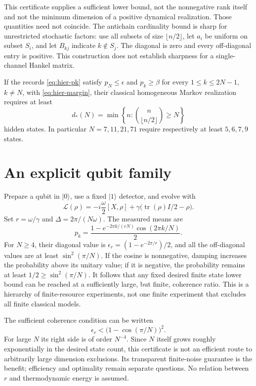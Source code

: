 This certificate supplies a sufficient lower bound, not the nonnegative rank
itself and not the minimum dimension of a positive dynamical realization.
Those quantities need not coincide. The antichain cardinality bound is sharp
for unrestricted stochastic factors: use all subsets of size $\lfloor n/2\rfloor$,
let $a_i$ be uniform on subset $S_i$, and let $B_{kj}$ indicate $k\notin S_j$.
The diagonal is zero and every off-diagonal entry is positive. This construction
does not establish sharpness for a single-channel Hankel matrix.

\begin{corollary}
\label{cor:hierarchy}
If the records \eqref{eq:hier-pk} satisfy $p_N\le\epsilon$ and
$p_k\ge\beta$ for every $1\le k\le2N-1$, $k\ne N$, with
\eqref{eq:hier-margin}, their classical homogeneous Markov realization requires
at least
\[
 d_*(N)=\min\left\{n:{n\choose\lfloor n/2\rfloor}\ge N\right\}
\]
hidden states. In particular $N=7,11,21,71$ require respectively at least
$5,6,7,9$ states.
\end{corollary}

\section{An explicit qubit family}
Prepare a qubit in $|0\rangle$, use a fixed $|1\rangle$ detector, and evolve
with
\[
 \mathcal L(\rho)=-i\frac{\omega}{2}[X,\rho]
 +\gamma\bigl(\operatorname{tr}(\rho)I/2-\rho\bigr).
\]
Set $r=\omega/\gamma$ and $\Delta=2\pi/(N\omega)$. The measured means are
\begin{equation}
 p_k=\frac{1-e^{-2\pi k/(rN)}\cos(2\pi k/N)}2.
                                                        \label{eq:hier-qubit}
\end{equation}
For $N\ge4$, their diagonal value is
$\epsilon_r=(1-e^{-2\pi/r})/2$, and all the off-diagonal values are at least
$\sin^2(\pi/N)$. If the cosine is nonnegative, damping increases the probability
above its unitary value; if it is negative, the probability remains at least
$1/2\ge\sin^2(\pi/N)$. It follows that any fixed desired finite state lower
bound can be reached at a sufficiently large, but finite, coherence ratio.
This is a hierarchy of finite-resource experiments, not one finite experiment
that excludes all finite classical models.

The sufficient coherence condition can be written
\begin{equation}
 \epsilon_r < \bigl(1-\cos(\pi/N)\bigr)^2.
                                                        \label{eq:hier-coherence}
\end{equation}
For large $N$ its right side is of order $N^{-4}$. Since $N$ itself grows
roughly exponentially in the desired state count, this certificate is not an
efficient route to arbitrarily large dimension exclusions. Its transparent
finite-noise guarantee is the benefit; efficiency and optimality remain
separate questions. No relation between $r$ and thermodynamic energy is assumed.

